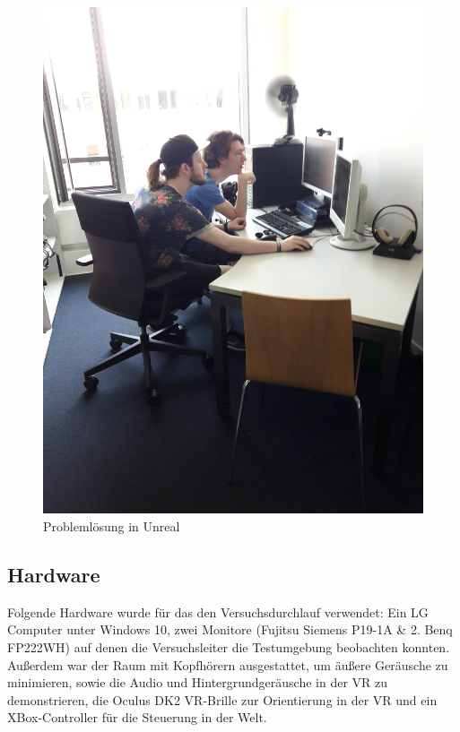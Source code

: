 \documentclass{Bericht}
\begin{document}
		
				
				
				
				
				
	

			

			
		\begin{figure}[!htbp] %
			\centering
			\includegraphics[trim = 200mm 0mm 600mm 0mm, clip, height=\linewidth, width=\textheight, keepaspectratio, angle=270]{../Bilder/20170619_102101.jpg} %
			\caption{Problemlösung in Unreal}
			\label{img:porblemloesung}
		\end{figure}
		
		

\subsection{Hardware}
\label{subsec:hardware}
Folgende Hardware wurde für das den Versuchsdurchlauf verwendet: Ein LG Computer unter Windows 10, zwei Monitore (Fujitsu Siemens P19-1A \& 2. Benq FP222WH) auf denen die Versuchsleiter die Testumgebung beobachten konnten. Außerdem war der Raum mit Kopfhörern ausgestattet, um äußere Geräusche zu minimieren, sowie die Audio und Hintergrundgeräusche in der VR zu demonstrieren, die Oculus DK2 VR-Brille zur Orientierung in der VR und ein XBox-Controller für die Steuerung in der Welt.
\end{document}
